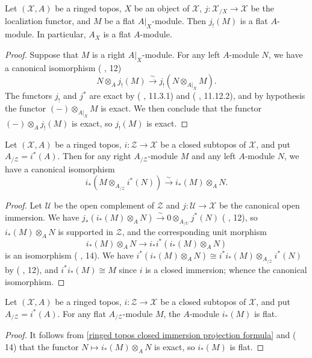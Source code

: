 \begin{proposition}\label{ringed topos flat module shrink is flat}
Let $(\mathcal{X},A)$ be a ringed topos, $X$ be an object of $\mathcal{X}$, $j:\mathcal{X}_{/X}\to \mathcal{X}$ be the localiztion functor, and $M$ be a flat $A|_X$-module. Then $j_!(M)$ is a flat $A$-module. In particular, $A_X$ is a flat $A$-module.
\end{proposition}
\begin{proof}
Suppose that $M$ is a right $A|_X$-module. For any left $A$-module $N$, we have a canonical isomorphism (\cite{SGA4-1} , 12)
\[N\otimes_Aj_!(M) \stackrel{\sim}{\to } j_!(N\otimes_{A|_X}M).\]
The functors $j_!$ and $j^*$ are exact by (\cite{SGA4-1} , 11.3.1) and (\cite{SGA4-1} , 11.12.2), and by hypothesis the functor $(-)\otimes_{A|_X}M$ is exact. We then conclude that the functor $(-)\otimes_Aj_!(M)$ is exact, so $j_!(M)$ is exact.
\end{proof}

\begin{proposition}\label{ringed topos closed immersion projection formula}
Let $(\mathcal{X},A)$ be a ringed topos, $i:\mathcal{Z}\to \mathcal{X}$ be a closed subtopos of $\mathcal{X}$, and put $A_{/\mathcal{Z}}=i^*(A)$. Then for any right $A_{/\mathcal{Z}}$-module $M$ and any left $A$-module $N$, we have a canonical isomorphism
\begin{equation}\label{ringed topos closed immersion projection formula-1}
i_*(M\otimes_{A_{/\mathcal{Z}}}i^*(N)) \stackrel{\sim}{\to } i_*(M)\otimes_AN.
\end{equation}
\end{proposition}
\begin{proof}
Let $\mathcal{U}$ be the open complement of $\mathcal{Z}$ and $j:\mathcal{U}\to \mathcal{X}$ be the canonical open immersion. We have $j_*(i_*(M)\otimes_AN) \stackrel{\sim}{\to } 0\otimes_{A_{/U}}j^*(N)$ (\cite{SGA4-1} , 12), so $i_*(M)\otimes_AN$ is supported in $\mathcal{Z}$, and the corresponding unit morphism
\[i_*(M)\otimes_AN\to i_*i^*(i_*(M)\otimes_AN)\]
is an isomorphism (\cite{SGA4-1} , 14). We have $i^*(i_*(M)\otimes_AN)\cong i^*i_*(M)\otimes_{A_{/\mathcal{Z}}}i^*(N)$ by (\cite{SGA4-1} , 12), and $i^*i_*(M)\cong M$ since $i$ is a closed immersion; whence the canonical isomorphism.
\end{proof}

\begin{corollary}\label{ringed topos closed immersion flat module direct image flat}
Let $(\mathcal{X},A)$ be a ringed topos, $i:\mathcal{Z}\to \mathcal{X}$ be a closed subtopos of $\mathcal{X}$, and put $A_{/\mathcal{Z}}=i^*(A)$. For any flat $A_{/\mathcal{Z}}$-module $M$, the $A$-module $i_*(M)$ is flat.
\end{corollary}
\begin{proof}
It follows from \cref{ringed topos closed immersion projection formula} and (\cite{SGA4-1}  14) that the functor $N\mapsto i_*(M)\otimes_AN$ is exact, so $i_*(M)$ is flat.
\end{proof}


